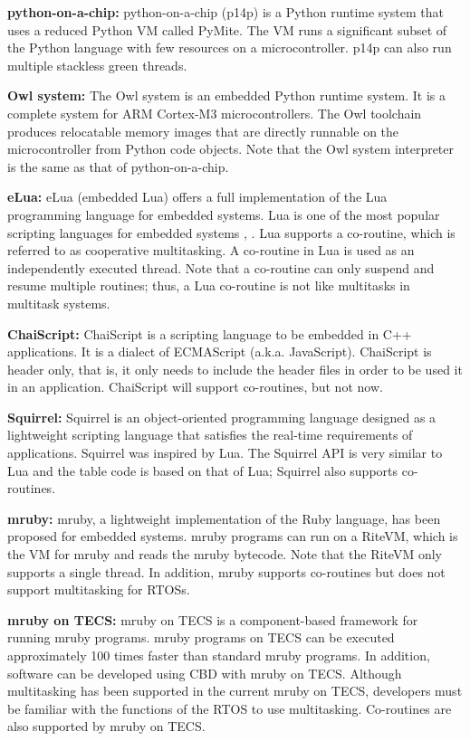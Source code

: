 \documentclass[S,R,E]{article/compsoft}
\begin{document}
{{\bf python-on-a-chip:} python-on-a-chip (p14p) is a Python runtime system that uses a reduced Python VM called PyMite.
The VM runs a significant subset of the Python language with few resources on a microcontroller.
p14p can also run multiple stackless green threads.

{\bf Owl system:} The Owl system is an embedded Python runtime system.
It is a complete system for ARM Cortex-M3 microcontrollers.
The Owl toolchain produces relocatable memory images that are directly runnable on the microcontroller from Python code objects.
Note that the Owl system interpreter is the same as that of python-on-a-chip.

{\bf eLua:} eLua (embedded Lua) offers a full implementation of the Lua programming language for embedded systems.
Lua is one of the most popular scripting languages for embedded systems \cite{url:Lua}, \cite{par:Lua}.
Lua supports a co-routine, which is referred to as cooperative multitasking.
A co-routine in Lua is used as an independently executed thread.
Note that a co-routine can only suspend and resume multiple routines; thus, a Lua co-routine is not like multitasks in multitask systems.

{\bf ChaiScript:} ChaiScript is a scripting language to be embedded in C++ applications.
It is a dialect of ECMAScript (a.k.a. JavaScript).
ChaiScript is header only, that is, it only needs to include the header files in order to be used it in an application.
ChaiScript will support co-routines, but not now. 

{\bf Squirrel:} Squirrel is an object-oriented programming language designed as a lightweight scripting language that satisfies the real-time requirements of applications.
Squirrel was inspired by Lua.
The Squirrel API is very similar to Lua and the table code is based on that of Lua; Squirrel also supports co-routines.

{\bf mruby:} mruby, a lightweight implementation of the Ruby language, has been proposed for embedded systems.
mruby programs can run on a RiteVM, which is the VM for mruby and reads the mruby bytecode.
Note that the RiteVM only supports a single thread.
In addition, mruby supports co-routines but does not support multitasking for RTOSs.

{\bf mruby on TECS:} mruby on TECS is a component-based framework for running mruby programs.
mruby programs on TECS can be executed approximately 100 times faster than standard mruby programs.
In addition, software can be developed using CBD with mruby on TECS.
Although multitasking has been supported in the current mruby on TECS, developers must be familiar with the functions of the RTOS to use multitasking.
Co-routines are also supported by mruby on TECS.

}
\end{document}
